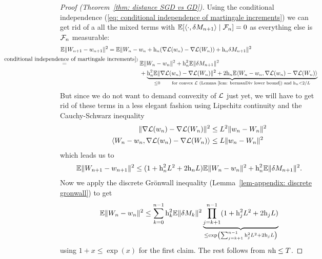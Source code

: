 \begin{proof}[Proof (Theorem~\ref{thm: distance SGD vs GD})]
	Using the conditional independence (\ref{eq: conditional independence of martingale increments})
	we can get rid of a all the mixed terms with
	\(\mathbb{E}[\langle \cdot, \delta M_{n+1}\rangle\mid\mathcal{F}_n]=0\) as everything
	else is \(\mathcal{F}_n\) measurable:
	\begin{align*}
		&\E\|\Weights_{n+1}-\weights_{n+1}\|^2
		= \E\|\Weights_n - \weights_n
		+ \lr_n(\nabla\Loss(\weights_n)-\nabla\Loss(\Weights_n))
		+ \lr_n\martIncr_{n+1}\|^2\\
		&\lxeq{(\ref{eq: conditional independence of martingale increments})}
		\begin{aligned}[t]
			&\E\|\Weights_n-\weights_n\|^2 + \lr_n^2\E\|\martIncr_{n+1}\|^2\\
			&+\underbrace{
				\lr_n^2\E\|\nabla\Loss(\weights_n)-\nabla\Loss(\Weights_n)\|^2
				+ 2\lr_n\E\langle\Weights_n-\weights_n,
				\nabla\Loss(\weights_n)-\nabla\Loss(\Weights_n)\rangle
			}_{
				\le 0 \qquad
				\text{for convex \(\Loss\) (Lemma~\ref{lem: bermanDiv lower bound}) and }
				\lr_n<2/\ubound
			}
		\end{aligned}
	\end{align*}
	But since we do not want to demand convexity of \(\mathcal{L}\) just yet, we will
	have to get rid of these terms in a less elegant fashion using Lipschitz
	continuity and the Cauchy-Schwarz inequality
	\begin{align*}
		\|\nabla\mathcal{L}(w_n)-\nabla\mathcal{L}(W_n)\|^2
		&\le L^2\|w_n-W_n\|^2\\
		\langle W_n-w_n,
		\nabla\mathcal{L}(w_n)-\nabla\mathcal{L}(W_n)\rangle
		&\le L \|w_n-W_n\|^2
	\end{align*}
	which leads us to
	\begin{align*}
		\mathbb{E}\|W_{n+1}-w_{n+1}\|^2
		\le (1+\text{h}_n^2L^2 + 2\text{h}_nL)\mathbb{E}\|W_n-w_n\|^2
		+ \text{h}_n^2\mathbb{E}\|\delta M_{n+1}\|^2.
	\end{align*}
	Now we apply the discrete Gr\"onwall inequality (Lemma~\ref{lem-appendix:
	discrete gronwall}) to get
	\begin{align*}
		\mathbb{E}\|W_n-w_n\|^2
		\le \sum_{k=0}^{n-1}\text{h}_k^2\mathbb{E}\|\delta M_k\|^2
		\underbrace{
			\prod_{j=k+1}^{n-1}(1+\text{h}_j^2L^2 + 2\text{h}_jL)
		}_{
			\le \exp\left(\sum_{j=k+1}^{n-1}\text{h}_j^2L^2 + 2\text{h}_jL\right)
		}
	\end{align*}
	using \(1+x\le\exp(x)\) for the first claim. The rest 
	follows from \(n\text{h}\le T\).
\end{proof}

